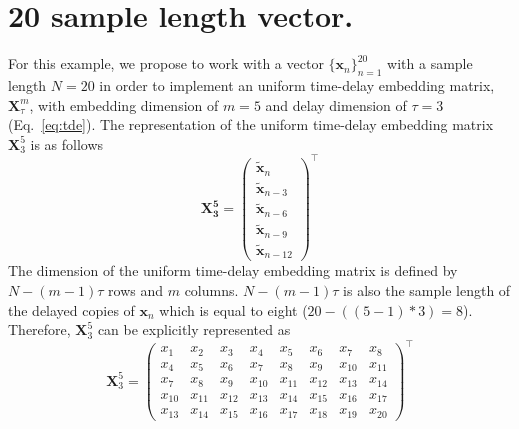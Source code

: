 \section{20 sample length vector.}
For this example, we propose to work with a vector 
$\{ \boldsymbol{x}_n \}_{n=1}^{20}$ with a sample length $N=20$ in order 
to implement an uniform time-delay embedding matrix, 
$\boldsymbol{X}^{m}_{\tau} $, with embedding dimension of $m=5$ 
and delay dimension of $\tau=3$ (Eq.~\eqref{eq:tde}).%
The representation of the uniform time-delay embedding matrix
$\boldsymbol{X}^{5}_{3}$ is as follows
\begin{equation}\label{eq:etde_example}
\boldsymbol{X^5_3} =
\begin{pmatrix}
  \boldsymbol{ \tilde{x} }_n \\
  \boldsymbol{ \tilde{x} }_{n-3} \\
  \boldsymbol{ \tilde{x} }_{n-6} \\
  \boldsymbol{ \tilde{x} }_{n-9} \\
  \boldsymbol{ \tilde{x} }_{n-12}
\end{pmatrix}^\intercal
\end{equation}
The dimension of the uniform time-delay embedding matrix is defined by
$N-(m-1)\tau$ rows and $m$ columns.
$N-(m-1)\tau$ is also the sample length of the delayed copies of 
$\boldsymbol{x}_n$ which is equal to eight ($20-((5-1)*3)=8$).
Therefore, $\boldsymbol{X}^{5}_{3}$ can be explicitly represented as
\begin{equation}\label{eq:etdee1}
\boldsymbol{X}^5_3 =
\begin{pmatrix}
  x_1 & x_2 & x_3 & x_4 & x_5 & x_6 & x_7 & x_8 \\
  x_4 & x_5 & x_6 & x_7 & x_8 & x_9 & x_{10} & x_{11} \\
  x_{7} & x_{8} & x_{9} & x_{10} & x_{11} & x_{12} & x_{13} & x_{14} \\
  x_{10} & x_{11} & x_{12} & x_{13} & x_{14} & x_{15} & x_{16} & x_{17} \\
  x_{13} & x_{14} & x_{15} & x_{16} & x_{17} & x_{18} & x_{19} & x_{20}
\end{pmatrix}^\intercal
\end{equation}

